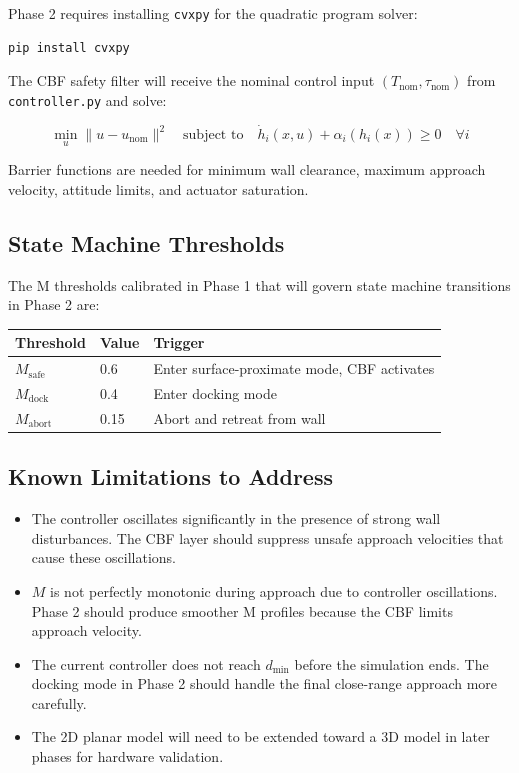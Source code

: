 \documentclass[12pt]{article}
\begin{document}
Phase 2 requires installing \texttt{cvxpy} for the quadratic program solver:

\begin{lstlisting}[language=bash]
pip install cvxpy
\end{lstlisting}

The CBF safety filter will receive the nominal control input
$(T_\mathrm{nom}, \tau_\mathrm{nom})$ from \texttt{controller.py} and solve:

\begin{equation}
    \min_u \|u - u_\mathrm{nom}\|^2 \quad \text{subject to} \quad
    \dot{h}_i(x, u) + \alpha_i(h_i(x)) \geq 0 \quad \forall i
\end{equation}

Barrier functions are needed for minimum wall clearance, maximum approach
velocity, attitude limits, and actuator saturation.

\subsection{State Machine Thresholds}

The M thresholds calibrated in Phase 1 that will govern state machine
transitions in Phase 2 are:

\begin{center}
\begin{tabular}{lll}
\toprule
\textbf{Threshold} & \textbf{Value} & \textbf{Trigger} \\
\midrule
$M_\mathrm{safe}$  & 0.6  & Enter surface-proximate mode, CBF activates \\
$M_\mathrm{dock}$  & 0.4  & Enter docking mode \\
$M_\mathrm{abort}$ & 0.15 & Abort and retreat from wall \\
\bottomrule
\end{tabular}
\end{center}

\subsection{Known Limitations to Address}

\begin{itemize}
    \item The controller oscillates significantly in the presence of strong
          wall disturbances. The CBF layer should suppress unsafe approach
          velocities that cause these oscillations.
    \item $M$ is not perfectly monotonic during approach due to controller
          oscillations. Phase 2 should produce smoother M profiles because
          the CBF limits approach velocity.
    \item The current controller does not reach $d_{\min}$ before the
          simulation ends. The docking mode in Phase 2 should handle the
          final close-range approach more carefully.
    \item The 2D planar model will need to be extended toward a 3D model
          in later phases for hardware validation.
\end{itemize}
\end{document}
